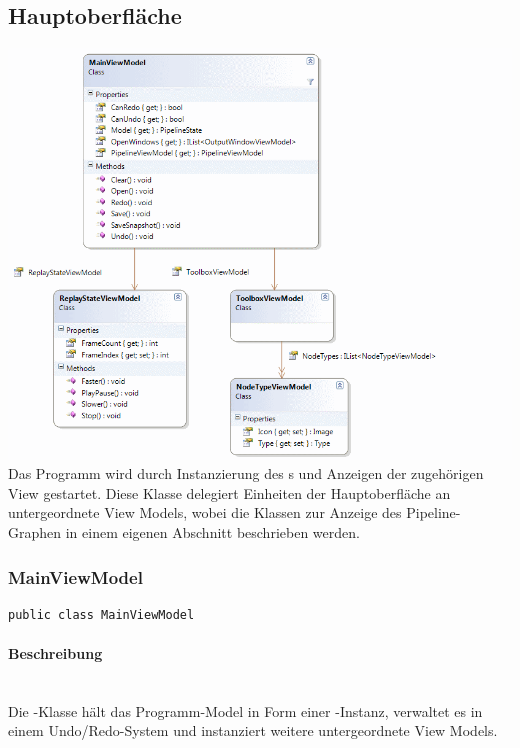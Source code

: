 \subsection{Hauptoberfläche}

\includegraphics[width=\textwidth]{YuvKA.ViewModel/main.png}
Das Programm wird durch Instanzierung des s und Anzeigen der zugehörigen View gestartet. Diese Klasse delegiert Einheiten der Hauptoberfläche an untergeordnete View Models, wobei die Klassen zur Anzeige des Pipeline-Graphen in einem eigenen Abschnitt beschrieben werden.

\subsubsection{MainViewModel}

\begin{verbatim}
public class MainViewModel
\end{verbatim}

\paragraph{Beschreibung}~\\
Die -Klasse hält das Programm-Model in Form einer -Instanz, verwaltet es in einem Undo/Redo-System und instanziert weitere untergeordnete View Models.

